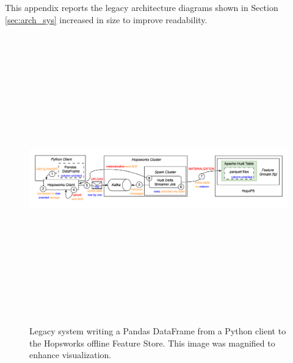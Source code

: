This appendix reports the legacy architecture diagrams shown in Section \ref{sec:arch_sys} increased in size to improve readability.

\begin{figure}
    \begin{center}
      \includegraphics[angle=90,origin=c,keepaspectratio,height=12.5cm]{figures/2-background/FeatureStore-writing.png}
    \end{center}
    \caption[Legacy system - Write process - Magnified diagram]{Legacy system writing a Pandas DataFrame from a Python client to the Hopsworks offline Feature Store.  This image was magnified to enhance visualization.}
    \label{fig:appx_featurestore_writing}
\end{figure}

